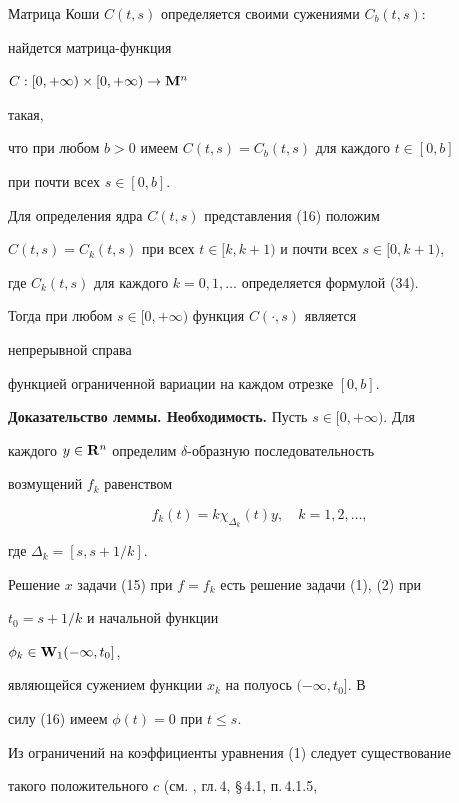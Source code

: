 Матрица Коши $C(t,s)$ определяется своими сужениями $C_b(t,s)$:


найдется матрица-функция


$C:[0,+\infty)\times[0,+\infty)\to\bold M^n$


такая,


что при любом $b>0$ имеем $C(t,s)=C_b(t,s)$ для каждого $t\in[0,b]$


при почти всех $s\in[0,b]$.





Для определения ядра $C(t,s)$ представления (16) положим


$C(t,s)=C_k(t,s)$ при всех $t\in[k,k+1)$ и почти всех $s\in[0,k+1)$,


где $C_k(t,s)$ для каждого $k=0,1,\dots$ определяется формулой (34).


Тогда при любом $s\in[0,+\infty)$ функция $C(\cdot,s)$ является


непрерывной справа


функцией ограниченной вариации на каждом отрезке $[0,b]$.





{\bf Доказательство леммы. Необходимость.} Пусть $s\in[0,+\infty)$. Для


каждого $y\in\bold R^n$ определим $\delta$-образную последовательность


возмущений $f_k$ равенством


$$


f_k(t)=k\chi_{\Delta_k}(t)y,\quad k=1,2,\dotsc,


$$


где $\Delta_k=[s,s+1/k]$.





Решение $x$ задачи (15) при $f=f_k$ есть решение задачи (1), (2) при


$t_0=s+1/k$ и начальной функции


$\phi_k\in\bold W_1(-\infty,t_0]$,


являющейся сужением функции $x_k$ на полуось $(-\infty,t_0]$. В


силу (16) имеем $\phi(t)=0$ при $t\le s$.





Из ограничений на коэффициенты уравнения (1) следует существование


такого положительного $c$ (см. \cite{Ku3}, гл.\,4, \S\,4.1, п.\,4.1.5,



